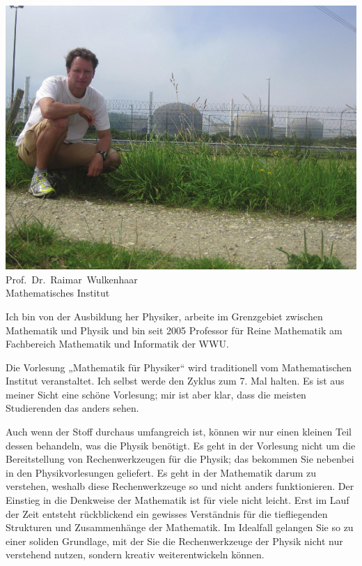 \begin{multicols}{2}
\begin{center}
\includegraphics[width=0.9\columnwidth]{res/vorstellungsfotos/wulkenhaar.png}\\
Prof.\ Dr.\ Raimar\ Wulkenhaar\\
Mathematisches Institut
\end{center}

Ich bin von der Ausbildung her Physiker, arbeite im Grenzgebiet zwischen Mathematik und Physik und bin seit 2005 Professor für Reine Mathematik am Fachbereich Mathematik und Informatik der WWU.

Die Vorlesung „Mathematik für Physiker“ wird traditionell vom Mathematischen Institut veranstaltet. Ich selbst werde den Zyklus zum 7. Mal halten. Es ist aus meiner Sicht eine schöne Vorlesung; mir ist aber klar, dass die meisten Studierenden das anders sehen.

Auch wenn der Stoff durchaus umfangreich ist, können wir nur einen kleinen Teil dessen behandeln, was die Physik benötigt. Es geht in der Vorlesung nicht um die Bereitstellung von Rechenwerkzeugen für die Physik; das bekommen Sie nebenbei in den Physikvorlesungen geliefert. Es geht in der Mathematik darum zu verstehen, weshalb diese Rechenwerkzeuge so und nicht anders funktionieren. Der Einstieg in die Denkweise der Mathematik ist für viele nicht leicht. Erst im Lauf der Zeit entsteht rückblickend ein gewisses Verständnis für die tiefliegenden Strukturen und Zusammenhänge der Mathematik. Im Idealfall gelangen Sie so zu einer soliden Grundlage, mit der Sie die Rechenwerkzeuge der Physik nicht nur verstehend nutzen, sondern kreativ weiterentwickeln können.



\end{multicols}
